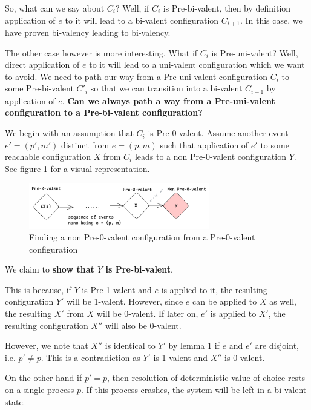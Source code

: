 So, what can we say about $C_i$? Well, if $C_i$ is Pre-bi-valent, then by definition application of $e$ to it will lead to a bi-valent configuration $C_{i+1}$. In this case, we have proven bi-valency leading to bi-valency.

The other case however is more interesting. What if $C_i$ is Pre-uni-valent? Well, direct application of $e$ to it will lead to a uni-valent configuration which we want to avoid. We need to path our way from a Pre-uni-valent configuration $C_i$ to some Pre-bi-valent $C'_{i}$ so that we can transition into a bi-valent $C_{i+1}$ by application of $e$. \textbf{Can we always path a way from a Pre-uni-valent configuration to a Pre-bi-valent configuration?}

We begin with an assumption that $C_i$ is Pre-0-valent. Assume another event $e' = (p', m')$ distinct from $e = (p, m)$ such that application of $e'$ to some reachable configuration $X$ from $C_i$ leads to a non Pre-0-valent configuration $Y$. See figure \ref{fig:finding-non-pre-0-valent} for a visual representation.

\begin{figure}[H]
    \centering
    \includegraphics[width=0.7\textwidth]{general-problems/assets/flp-pre-0-valent-to-non-pre-0-valent.png}
    \caption{Finding a non Pre-0-valent configuration from a Pre-0-valent configuration}
    \label{fig:finding-non-pre-0-valent}
\end{figure}

We claim to \textbf{show that $Y$ is Pre-bi-valent}.

This is because, if $Y$ is Pre-1-valent and $e$ is applied to it, the resulting configuration $Y'$ will be 1-valent. However, since $e$ can be applied to $X$ as well, the resulting $X'$ from $X$ will be 0-valent. If later on, $e'$ is applied to $X'$, the resulting configuration $X''$ will also be 0-valent.

However, we note that $X''$ is identical to $Y'$ by lemma 1 if $e$ and $e'$ are disjoint, i.e. $p' \ne p$. This is a contradiction as $Y'$ is 1-valent and $X''$ is 0-valent.

On the other hand if $p' = p$, then resolution of deterministic value of choice rests on a single process $p$. If this process crashes, the system will be left in a bi-valent state.

